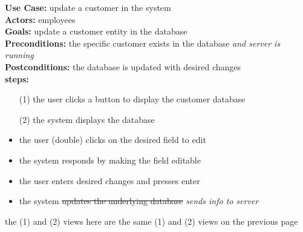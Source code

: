 \documentclass[notitlepage,11pt]{article}
\begin{document}
\newpage
\textbf{Use Case:} update a customer in the system\\
\textbf{Actors:} employees\\
\textbf{Goals:} update a customer entity in the database\\
\textbf{Preconditions:} the specific customer exists in the database \emph{and server is running}\\
\textbf{Postconditions:} the database is updated with desired changes\\
\textbf{steps:}
	\begin{itemize}
		\item[(1)] the user clicks a button to display the customer database
		\item[(2)] the system displays the database
		\item the user (double) clicks on the desired field to edit
		\item the system responds by making the field editable
		\item the user enters desired changes and presses enter
		\item the system \sout{updates the underlying database} \emph{sends info to server}
	\end{itemize}
the (1) and (2) views here are the same (1) and (2) views on the previous page
\end{document}
